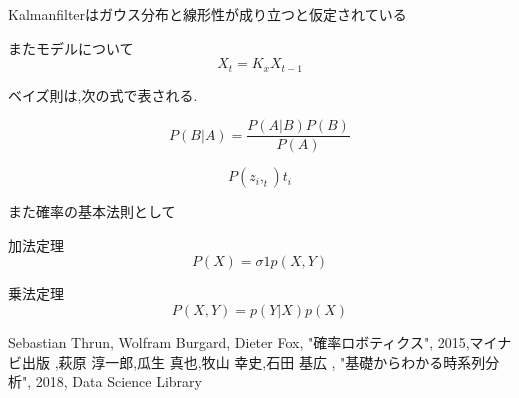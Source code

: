 \documentclass[12pt]{jsarticle}
\begin{document}
Kalmanfilterはガウス分布と線形性が成り立つと仮定されている

またモデルについて
\begin{equation}
  X_t=K_xX_{t-1}
\end{equation}

ベイズ則は,次の式で表される.

\begin{equation}
  P(B|A) = \frac{P(A|B)P(B)}{P(A)}
\end{equation}

\begin{equation}
 P(z_i,_t){t_i}
\end{equation}

また確率の基本法則として

加法定理
\begin{equation}
  P(X)=\sigma{1}{p(X,Y)}
\end{equation}

乗法定理
\begin{equation}
  P(X,Y)=p(Y|X)p(X)
\end{equation}

\begin{thebibliography}{9}
  Sebastian Thrun, Wolfram Burgard, Dieter Fox, "確率ロボティクス", 2015,マイナビ出版 
  ,萩原 淳一郎,瓜生 真也,牧山 幸史,石田 基広 , "基礎からわかる時系列分析", 2018, Data Science Library
\end{thebibliography}
\end{document}
